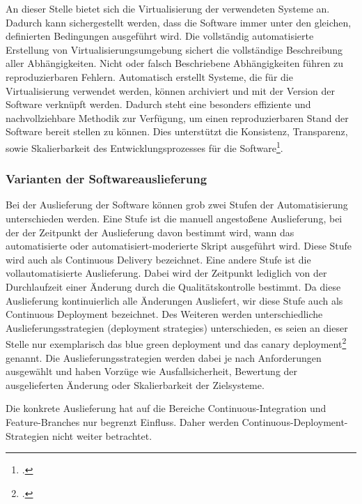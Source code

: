 An dieser Stelle bietet sich die Virtualisierung der verwendeten Systeme an. Dadurch kann sichergestellt werden, dass die Software immer unter den gleichen, definierten Bedingungen ausgeführt wird. Die vollständig automatisierte Erstellung von Virtualisierungsumgebung sichert die vollständige Beschreibung aller Abhängigkeiten. Nicht oder falsch Beschriebene Abhängigkeiten führen zu reproduzierbaren Fehlern.
Automatisch erstellt Systeme, die für die Virtualisierung verwendet werden, können archiviert und mit der Version der Software verknüpft werden. Dadurch steht eine besonders effiziente und nachvollziehbare Methodik zur Verfügung, um einen reproduzierbaren Stand der Software bereit stellen zu können. Dies unterstützt die Konsistenz, Transparenz, sowie Skalierbarkeit des Entwicklungsprozesses für die Software\footcite[vgl.][Kap. Why are containers important?]{learn-docker}.

\subsubsection{Varianten der Softwareauslieferung}

Bei der Auslieferung der Software können grob zwei Stufen der Automatisierung unterschieden werden. Eine Stufe ist die manuell angestoßene Auslieferung, bei der der Zeitpunkt der Auslieferung davon bestimmt wird, wann das automatisierte 
oder automatisiert-moderierte Skript ausgeführt wird. Diese Stufe wird auch als \glqq Continuous Delivery\grqq{} bezeichnet. Eine andere Stufe ist die vollautomatisierte Auslieferung. Dabei wird der
Zeitpunkt lediglich von der Durchlaufzeit einer Änderung durch die Qualitätskontrolle bestimmt. Da diese Auslieferung kontinuierlich alle Änderungen Ausliefert, wir diese Stufe auch als \glqq Continuous Deployment\grqq{} bezeichnet.
Des Weiteren werden unterschiedliche Auslieferungsstrategien (\glqq deployment strategies\grqq{}) unterschieden, es seien an
dieser Stelle nur exemplarisch das \glqq blue green deployment\grqq{} und das \glqq canary deployment\grqq{}\footcite[261-264 Deploying and Releasing Applications][]
{humble2010} genannt. Die Auslieferungsstrategien werden dabei je nach Anforderungen ausgewählt und haben Vorzüge wie 
Ausfallsicherheit, Bewertung der ausgelieferten Änderung oder Skalierbarkeit der Zielsysteme.

Die konkrete Auslieferung hat auf die Bereiche Continuous-Integration und Feature-Branches nur begrenzt Einfluss. Daher 
werden Continuous-Deployment-Strategien nicht weiter betrachtet.

